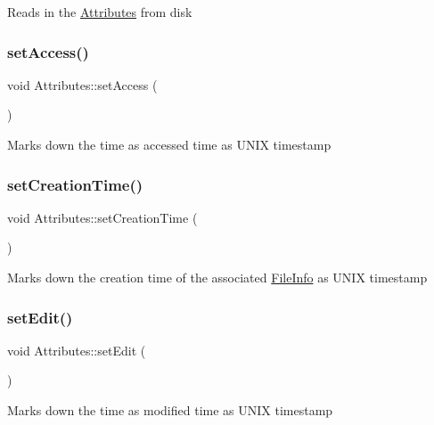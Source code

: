 Reads in the \mbox{\hyperlink{classAttributes}{Attributes}} from disk \mbox{\label{classAttributes_ae4861b7312f8619a6b2988b9456c4604}} 
\subsubsection{\texorpdfstring{set\+Access()}{setAccess()}}
{\footnotesize\ttfamily void Attributes\+::set\+Access (\begin{DoxyParamCaption}{ }\end{DoxyParamCaption})}

Marks down the time as accessed time as U\+N\+IX timestamp \mbox{\label{classAttributes_a4caf96b812e181975045a172fe0dc438}} 
\subsubsection{\texorpdfstring{set\+Creation\+Time()}{setCreationTime()}}
{\footnotesize\ttfamily void Attributes\+::set\+Creation\+Time (\begin{DoxyParamCaption}{ }\end{DoxyParamCaption})}

Marks down the creation time of the associated \mbox{\hyperlink{classFileInfo}{File\+Info}} as U\+N\+IX timestamp \mbox{\label{classAttributes_aa091d2dba315a124ea4a14308f2553c6}} 
\subsubsection{\texorpdfstring{set\+Edit()}{setEdit()}}
{\footnotesize\ttfamily void Attributes\+::set\+Edit (\begin{DoxyParamCaption}{ }\end{DoxyParamCaption})}

Marks down the time as modified time as U\+N\+IX timestamp \mbox{\label{classAttributes_a56ab60c4bad40e1a47e096526f3ce57a}} 
